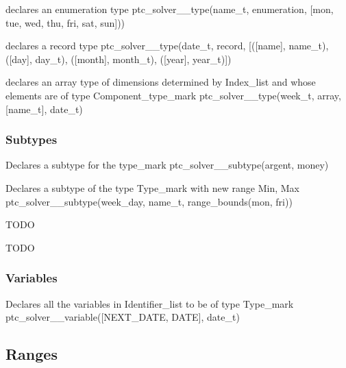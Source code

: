 \documentclass{article}
\begin{document}
        {declares an enumeration type}
        {ptc\_solver\_\_type(name\_t, enumeration, [mon, tue, wed, thu, fri, sat,
sun]))}
        {}

        {declares a record type}
        {ptc\_solver\_\_type(date\_t, record, [([name], name\_t), ([day],
day\_t),
    ([month], month\_t), ([year], year\_t)])}
        {}

        {declares an array type of dimensions determined by Index\_list and whose
elements
        are of type Component\_type\_mark}
        {ptc\_solver\_\_type(week\_t, array, [name\_t], date\_t)}
        {}

\subsubsection{Subtypes}

\hspace{\parindent}
    {Declares a subtype for the type\_mark}
    {ptc\_solver\_\_subtype(argent, money)}
        {}

        {Declares a subtype of the type Type\_mark with new range Min, Max}
    {ptc\_solver\_\_subtype(week\_day, name\_t, range\_bounds(mon, fri))}
    {}

    {TODO}
    {}
    {}

        {TODO}
        {}
        {}

\subsubsection{Variables}

\hspace{\parindent}
    {Declares all the variables in Identifier\_list to be of type Type\_mark}
    {ptc\_solver\_\_variable([NEXT\_DATE, DATE], date\_t)}
    {}


\subsection{Ranges}
\end{document}
